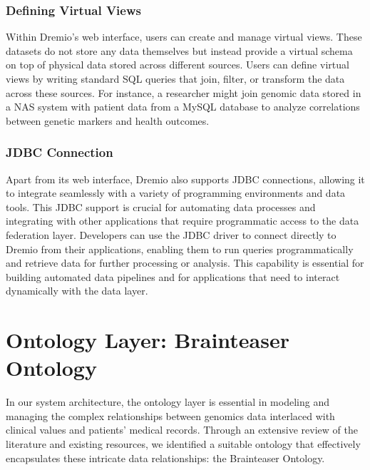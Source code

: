 \subsubsection{Defining Virtual Views}
Within Dremio's web interface, users can create and manage virtual views. These datasets do not store any data themselves but instead provide a virtual schema on top of physical data stored across different sources. Users can define virtual views by writing standard SQL queries that join, filter, or transform the data across these sources. For instance, a researcher might join genomic data stored in a NAS system with patient data from a MySQL database to analyze correlations between genetic markers and health outcomes.
\subsubsection{JDBC Connection}
Apart from its web interface, Dremio also supports \ac{JDBC} connections, allowing it to integrate seamlessly with a variety of programming environments and data tools. This \ac{JDBC} support is crucial for automating data processes and integrating with other applications that require programmatic access to the data federation layer. Developers can use the \ac{JDBC} driver to connect directly to Dremio from their applications, enabling them to run queries programmatically and retrieve data for further processing or analysis. This capability is essential for building automated data pipelines and for applications that need to interact dynamically with the data layer.

\section{Ontology Layer: Brainteaser Ontology}
In our system architecture, the ontology layer is essential in modeling and managing the complex relationships between genomics data interlaced with clinical values and patients' medical records. Through an extensive review of the literature and existing resources, we identified a suitable ontology that effectively encapsulates these intricate data relationships: the Brainteaser Ontology.
